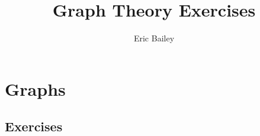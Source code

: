 \documentclass[nobib]{tufte-book}
\title{Graph Theory Exercises}
\author{Eric Bailey}
\begin{document}
\frontmatter


\maketitle

\tableofcontents



\mainmatter

\chapter{Graphs}
\label{ch:graphs}

\section{Exercises}
\end{document}
